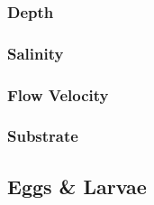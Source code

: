 \documentclass[
]{book}
\begin{document}
\hypertarget{depth-4}{%
\subsubsection{Depth}\label{depth-4}}

\hypertarget{salinity-4}{%
\subsubsection{Salinity}\label{salinity-4}}

\hypertarget{flow-velocity-4}{%
\subsubsection{Flow Velocity}\label{flow-velocity-4}}

\hypertarget{substrate-4}{%
\subsubsection{Substrate}\label{substrate-4}}

\hypertarget{eggs-larvae-1}{%
\subsection{Eggs \& Larvae}\label{eggs-larvae-1}}
\end{document}
